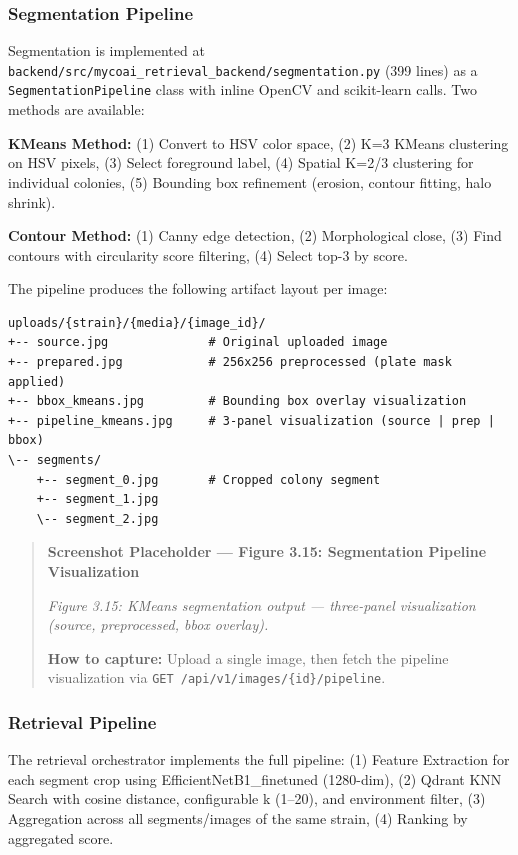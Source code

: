 \subsubsection{Segmentation Pipeline}\label{segmentation-pipeline}

Segmentation is implemented at \texttt{backend/src/mycoai\_retrieval\_backend/segmentation.py} (399 lines) as a \texttt{SegmentationPipeline} class with inline OpenCV and scikit-learn calls. Two methods are available:

\textbf{KMeans Method:} (1) Convert to HSV color space, (2) K=3 KMeans clustering on HSV pixels, (3) Select foreground label, (4) Spatial K=2/3 clustering for individual colonies, (5) Bounding box refinement (erosion, contour fitting, halo shrink).

\textbf{Contour Method:} (1) Canny edge detection, (2) Morphological close, (3) Find contours with circularity score filtering, (4) Select top-3 by score.

The pipeline produces the following artifact layout per image:

\begin{verbatim}
uploads/{strain}/{media}/{image_id}/
+-- source.jpg              # Original uploaded image
+-- prepared.jpg            # 256x256 preprocessed (plate mask applied)
+-- bbox_kmeans.jpg         # Bounding box overlay visualization
+-- pipeline_kmeans.jpg     # 3-panel visualization (source | prep | bbox)
\-- segments/
    +-- segment_0.jpg       # Cropped colony segment
    +-- segment_1.jpg
    \-- segment_2.jpg
\end{verbatim}

\begin{quote}
\textbf{Screenshot Placeholder --- Figure 3.15: Segmentation Pipeline Visualization}

\emph{Figure 3.15: KMeans segmentation output --- three-panel visualization (source, preprocessed, bbox overlay).}

\textbf{How to capture:} Upload a single image, then fetch the pipeline visualization via \texttt{GET\ /api/v1/images/\{id\}/pipeline}.
\end{quote}

\subsubsection{Retrieval Pipeline}\label{retrieval-pipeline}

The retrieval orchestrator implements the full pipeline: (1) Feature Extraction for each segment crop using EfficientNetB1\_finetuned (1280-dim), (2) Qdrant KNN Search with cosine distance, configurable k (1--20), and environment filter, (3) Aggregation across all segments/images of the same strain, (4) Ranking by aggregated score.

